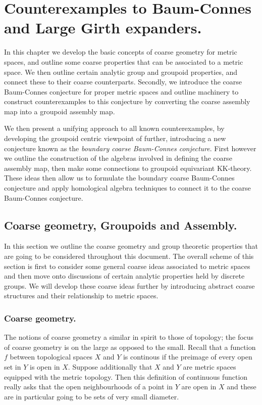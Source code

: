 \chapter{Counterexamples to Baum-Connes and Large Girth expanders.}
In this chapter we develop the basic concepts of coarse geometry for metric spaces, and outline some coarse properties that can be associated to a metric space. We then outline certain analytic group and groupoid properties, and connect these to their coarse counterparts. Secondly, we introduce the coarse Baum-Connes conjecture for proper metric spaces and outline machinery to construct counterexamples to this conjecture by converting the coarse assembly map into a groupoid assembly map.

We then present a unifying approach to all known counterexamples, by developing the groupoid centric viewpoint of \cite{MR1911663} further, introducing a new conjecture known as the \textit{boundary coarse Baum-Connes conjecture}. First however we outline the construction of the algebras involved in defining the coarse assembly map, then make some connections to groupoid equivariant KK-theory. These ideas then allow us to formulate the boundary coarse Baum-Connes conjecture and apply homological algebra techniques to connect it to the coarse Baum-Connes conjecture.

\section{Coarse geometry, Groupoids and Assembly.}
In this section we outline the coarse geometry and group theoretic properties that are going to be considered throughout this document. The overall scheme of this section is first to consider some general coarse ideas associated to metric spaces and then move onto discussions of certain analytic properties held by discrete groups. We will develop these coarse ideas further by introducing abstract coarse structures and their relationship to metric spaces.

\subsection{Coarse geometry.}
The notions of coarse geometry a similar in spirit to those of topology; the focus of coarse geometry is on the large as opposed to the small. Recall that a function $f$ between topological spaces $X$ and $Y$ is continous if the preimage of every open set in $Y$ is open in $X$. Suppose additionally that $X$ and $Y$ are metric spaces equipped with the metric topology. Then this definition of continuous function really asks that the open neighbourhoods of a point in $Y$ are open in $X$ and these are in particular going to be sets of very small diameter. 

